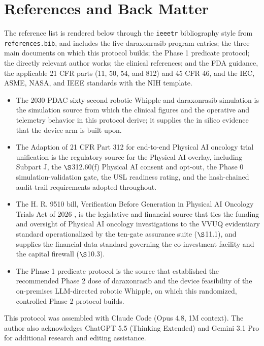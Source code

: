\section{References and Back Matter}

The reference list is rendered below through the \texttt{ieeetr} bibliography style
from \texttt{references.bib}, and includes the five daraxonrasib program entries; the
three main documents on which this protocol builds; the Phase 1 predicate protocol;
the directly relevant author works; the clinical references; and the FDA guidance,
the applicable 21 CFR parts (11, 50, 54, and 812) and 45 CFR 46, and the IEC, ASME,
NASA, and IEEE standards with the NIH template.

\begin{itemize}[leftmargin=1.6em,itemsep=3pt,topsep=2pt]
\item The 2030 PDAC sixty-second robotic Whipple and daraxonrasib simulation
\cite{kawchak_2026_20196639} is the simulation source from which the clinical
figures and the operative and telemetry behavior in this protocol derive; it
supplies the in silico evidence that the device arm is built upon.
\item The Adaption of 21 CFR Part 312 for end-to-end Physical AI oncology trial
unification \cite{kawchak2026adapt312} is the regulatory source for the Physical AI
overlay, including Subpart J, the $\S$312.60(f) Physical AI consent and opt-out, the
Phase 0 simulation-validation gate, the USL readiness rating, and the hash-chained
audit-trail requirements adopted throughout.
\item The H. R. 9510 bill, Verification Before Generation in Physical AI Oncology
Trials Act of 2026 \cite{kawchak2026hr9510}, is the legislative and financial source
that ties the funding and oversight of Physical AI oncology investigations to the
VVUQ evidentiary standard operationalized by the ten-gate assurance suite
($\S$11.1), and supplies the financial-data standard governing the co-investment
facility and the capital firewall ($\S$10.3).
\item The Phase 1 predicate protocol \cite{kawchak2026phase1} is the source that
established the recommended Phase 2 dose of daraxonrasib and the device feasibility
of the on-premises LLM-directed robotic Whipple, on which this randomized,
controlled Phase 2 protocol builds.
\end{itemize}

This protocol was assembled with Claude Code (Opus 4.8, 1M context). The author also
acknowledges ChatGPT 5.5 (Thinking Extended) and Gemini 3.1 Pro for additional
research and editing assistance.

